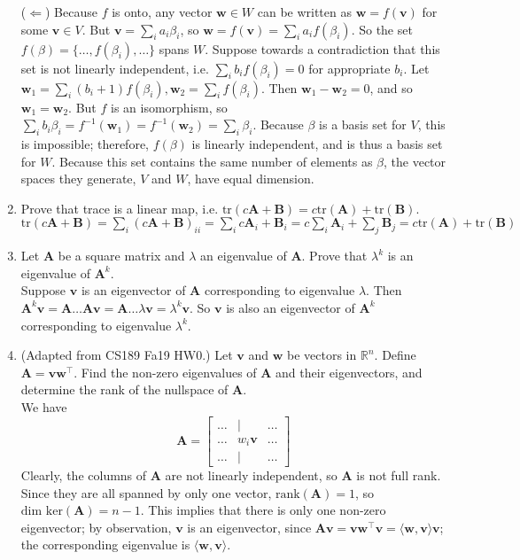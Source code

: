 \documentclass{article}
\begin{document}
\begin{enumerate}[label=\arabic*.]
{($\Leftarrow$) Because $f$ is onto, any vector $\mathbf{w} \in W$ can be written as $\mathbf{w} = f(\mathbf{v})$ for some $\mathbf{v} \in V$. But $\mathbf{v} = \sum\limits_i a_i\beta_i$, so $\mathbf{w}  = f(\mathbf{v}) = \sum\limits_i a_if(\beta_i)$. So the set $f(\beta) = \{\hdots, f(\beta_i), \hdots \}$ spans $W$. Suppose towards a contradiction that this set is not linearly independent, i.e. $\sum\limits_i b_if(\beta_i) = 0$ for appropriate $b_i$. Let $\mathbf{w}_1 = \sum\limits_i (b_i + 1)f(\beta_i), \mathbf{w}_2 = \sum\limits_i f(\beta_i)$. Then $\mathbf{w}_1 - \mathbf{w}_2 = 0$, and so $\mathbf{w}_1 = \mathbf{w}_2$. But $f$ is an isomorphism, so $\sum\limits_{i} b_i\beta_i = f^{-1}(\mathbf{w}_1) = f^{-1}(\mathbf{w}_2) = \sum\limits_{i}\beta_i$. Because $\beta$ is a basis set for $V$, this is impossible; therefore, $f(\beta)$ is linearly independent, and is thus a basis set for $W$. Because this set contains the same number of elements as $\beta$, the vector spaces they generate, $V$ and $W$, have equal dimension.}
\item Prove that trace is a linear map, i.e. $\text{tr}(c\mathbf{A + B}) = c\text{tr}(\mathbf{A}) + \text{tr}(\mathbf{B})$. \\
{\color{blue} $\text{tr}(c\mathbf{A + B}) = \sum\limits_{i} (c\mathbf{A + B})_{ii} = \sum\limits_{i} c\mathbf{A}_i + \mathbf{B}_i = c\sum\limits_{i} \mathbf{A}_i + \sum\limits_{j} \mathbf{B}_j = c\text{tr}(\mathbf{A}) + \text{tr}(\mathbf{B})$ } 
\item Let $\mathbf{A}$ be a square matrix and $\lambda$ an eigenvalue of $\mathbf{A}$. Prove that $\lambda^k$ is an eigenvalue of $\mathbf{A}^k$. \\
{\color{blue} Suppose $\mathbf{v}$ is an eigenvector of $\mathbf{A}$ corresponding to eigenvalue $\lambda$. Then $\mathbf{A}^k\mathbf{v} = \mathbf{A}\hdots\mathbf{Av} = \mathbf{A}\hdots\lambda\mathbf{v} = \lambda^k\mathbf{v}$. So $\mathbf{v}$ is also an eigenvector of $\mathbf{A}^k$ corresponding to eigenvalue $\lambda^k$. }
\item (Adapted from CS189 Fa19 HW0.) Let $\mathbf{v}$ and $\mathbf{w}$ be vectors in $\mathbb{R}^n$. Define $\mathbf{A} = \mathbf{vw^{\top}}$. Find the non-zero eigenvalues of $\mathbf{A}$ and their eigenvectors, and determine the rank of the nullspace of $\mathbf{A}$. \\
{\color{blue} We have $$\mathbf{A} = \begin{bmatrix} \hdots & \vert & \hdots \\ \hdots & w_i\mathbf{v} & \hdots \\ \hdots & \vert & \hdots \end{bmatrix}$$ Clearly, the columns of $\mathbf{A}$ are not linearly independent, so $\mathbf{A}$ is not full rank. Since they are all spanned by only one vector, $\text{rank}(\mathbf{A}) = 1$, so $\text{dim ker}(\mathbf{A}) = n - 1$. This implies that there is only one non-zero eigenvector; by observation, $\mathbf{v}$ is an eigenvector, since $\mathbf{Av = vw^{\top}v = \langle w, v\rangle v}$; the corresponding eigenvalue is $\langle \mathbf{w, v}\rangle$.}

\end{enumerate}
\end{document}
